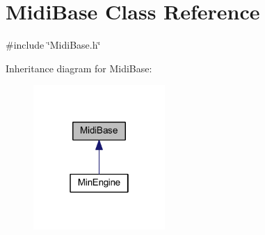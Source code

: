 \hypertarget{class_midi_base}{}\section{Midi\+Base Class Reference}
\label{class_midi_base}


{\ttfamily \#include \char`\"{}Midi\+Base.\+h\char`\"{}}



Inheritance diagram for Midi\+Base\+:
\nopagebreak
\begin{figure}[H]
\begin{center}
\leavevmode
\includegraphics[width=142pt]{class_midi_base__inherit__graph}
\end{center}
\end{figure}
